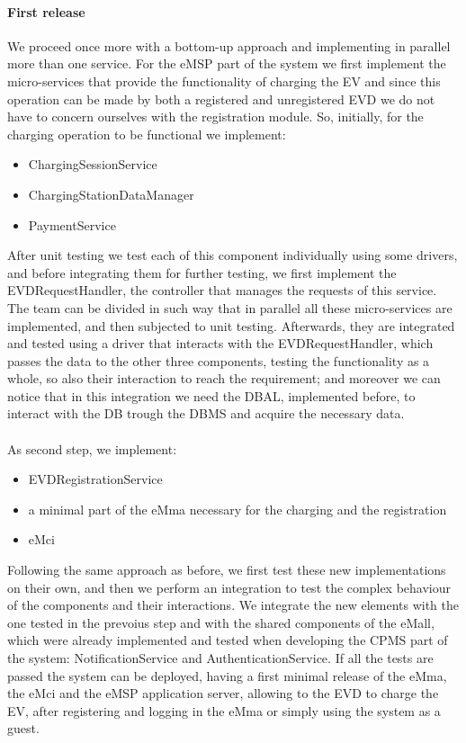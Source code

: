 \paragraph{First release}
We proceed once more with a bottom-up approach and implementing in parallel more than one service. For the eMSP part of the system we first implement the micro-services that provide the functionality of charging the EV and since this operation can be made by both a registered and unregistered EVD we do not have to concern ourselves with the registration module. So, initially, for the charging operation to be functional we implement:
\begin{itemize}
    \item ChargingSessionService
    \item ChargingStationDataManager
    \item PaymentService
\end{itemize}
After unit testing we test each of this component individually using some drivers, and before integrating them for further testing, we first implement the EVDRequestHandler, the controller that manages the requests of this service. The team can be divided in such way that in parallel all these micro-services are implemented, and then subjected to unit testing. Afterwards, they are integrated and tested using a driver that interacts with the EVDRequestHandler, which passes the data to the other three components, testing the functionality as a whole, so also their interaction to reach the requirement; and moreover we can notice that in this integration we need the DBAL, implemented before, to interact with the DB trough the DBMS and acquire the necessary data.\\\\
As second step, we implement:
\begin{itemize}
    \item EVDRegistrationService
    \item a minimal part of the eMma necessary for the charging and the registration
    \item eMci
\end{itemize}
Following the same approach as before, we first test these new implementations on their own, and then we perform an integration to test the complex behaviour of the components and their interactions. We integrate the new elements with the one tested in the prevoius step and with the shared components of the eMall, which were already implemented and tested when developing the CPMS part of the system: NotificationService and AuthenticationService. If all the tests are passed the system can be deployed, having a first minimal release of the eMma, the eMci and the eMSP application server, allowing to the EVD to charge the EV, after registering and logging in the eMma or simply using the system as a guest. 


